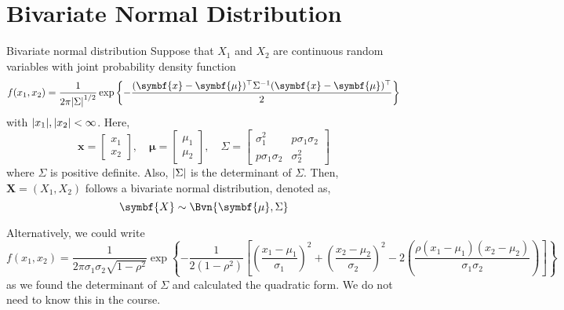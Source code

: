 \section{Bivariate Normal Distribution}
\begin{Definition}{Bivariate normal distribution}{}
    Suppose that $ X_1 $ and $ X_2 $
    are continuous random variables with joint probability
    density function
    \[ f(x_1,x_2)=\frac{1}{2\pi\abs*{\Sigma}^{1/2}}
        \exp\left\{ -\frac{(\symbf{x}-\symbf{\mu})^\top \Sigma^{-1}(\symbf{x}-\symbf{\mu})^\top
        }{2} \right\}  \]
    with $ \abs{x_1},\abs{x_2}<\infty $. Here,
    \[ \symbf{x}=\begin{bmatrix}
            x_1 \\
            x_2
        \end{bmatrix},\quad
        \symbf{\mu}=\begin{bmatrix}
            \mu_1 \\
            \mu_2
        \end{bmatrix},\quad
        \Sigma=
        \begin{bmatrix}
            \sigma_1^2        & p\sigma_1\sigma_2 \\
            p\sigma_1\sigma_2 & \sigma_2^2
        \end{bmatrix} \]
    where $ \Sigma $ is positive definite. Also,
    $ \abs*{\Sigma} $ is the determinant of $ \Sigma $.
    Then, $ \symbf{X}=(X_1,X_2) $ follows a bivariate normal distribution,
    denoted as,
    \[ \symbf{X}\sim\Bvn{\symbf{\mu},\Sigma}  \]
\end{Definition}
\begin{Remark}{}{}
    Alternatively, we could write
    \[ f(x_1,x_2)=\frac{1}{2\pi\sigma_1\sigma_2\sqrt{1-\rho^2}}
        \exp\left\{ -\frac{1}{2(1-\rho^2)}
        \left[ \left( \frac{x_1-\mu_1}{\sigma_1}  \right)^2+
            \left( \frac{x_2-\mu_2}{\sigma_2}  \right)^2-
            2\left( \frac{\rho(x_1-\mu_1)(x_2-\mu_2)}{\sigma_1\sigma_2} \right) \right] \right\}  \]
    as we found the determinant of $ \Sigma $ and calculated the quadratic form.
    We do not need to know this in the course.
\end{Remark}
